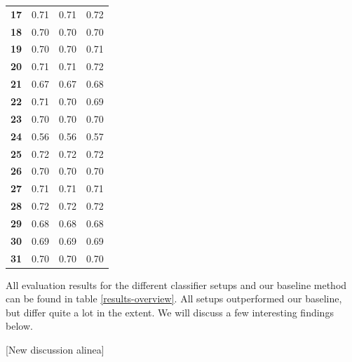 \documentclass[
10pt, %
a4paper, %
oneside, %
headinclude,footinclude, %
] {book}%
\begin{document}
\begin{table}[]
\begin{tabular}{@{}llll@{}}
\textbf{17}       & 0.71                   & 0.71                & 0.72              \\
\textbf{18}       & 0.70                   & 0.70                & 0.70              \\
\textbf{19}       & 0.70                   & 0.70                & 0.71              \\
\textbf{20}       & 0.71                   & 0.71                & 0.72              \\
\textbf{21}       & 0.67                   & 0.67                & 0.68              \\
\textbf{22}       & 0.71                   & 0.70                & 0.69              \\
\textbf{23}       & 0.70                   & 0.70                & 0.70              \\
\textbf{24}       & 0.56                   & 0.56                & 0.57              \\

\textbf{25}       & 0.72                   & 0.72                & 0.72              \\
\textbf{26}       & 0.70                   & 0.70                & 0.70              \\
\textbf{27}       & 0.71                   & 0.71                & 0.71              \\
\textbf{28}       & 0.72                   & 0.72                & 0.72              \\
\textbf{29}       & 0.68                   & 0.68                & 0.68              \\
\textbf{30}       & 0.69                   & 0.69                & 0.69              \\
\textbf{31}       & 0.70                   & 0.70                & 0.70              \\ \bottomrule
\end{tabular}
\end{table}

All evaluation results for the different classifier setups and our baseline method can be found in table \ref{results-overview}. All setups outperformed our baseline, but differ quite a lot in the extent. We will discuss a few interesting findings below.

[New discussion alinea] 

\end{document}
